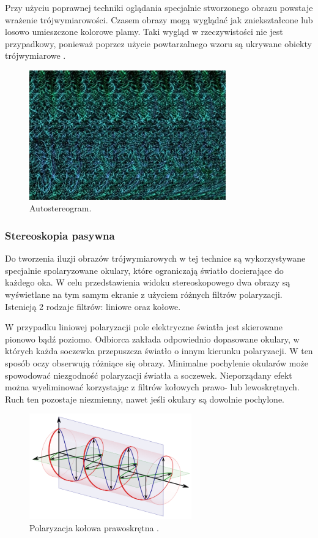 Przy użyciu poprawnej techniki oglądania specjalnie stworzonego obrazu powstaje wrażenie trójwymiarowości. Czasem obrazy mogą wyglądać jak zniekształcone lub losowo umieszczone kolorowe plamy. Taki wygląd w rzeczywistości nie jest przypadkowy, ponieważ poprzez użycie powtarzalnego wzoru są ukrywane obiekty trójwymiarowe \cite{stereoscopythesis}.

\begin{figure}[H]
		\centering
 		\includegraphics[width=8.5cm]{68.jpg}
    	\caption{Autostereogram\cite{autostereogram}.}
 		\label{rys26}
\end{figure}

\subsubsection{Stereoskopia pasywna} 
Do tworzenia iluzji obrazów trójwymiarowych w tej technice są wykorzystywane specjalnie spolaryzowane okulary, które ograniczają światło docierające do każdego oka. W celu przedstawienia widoku stereoskopowego dwa obrazy są wyświetlane na tym samym ekranie z użyciem różnych filtrów polaryzacji. Istenieją 2 rodzaje filtrów: liniowe oraz kołowe.

W przypadku liniowej polaryzacji pole elektryczne światła jest skierowane pionowo bądź poziomo. Odbiorca zakłada odpowiednio dopasowane okulary, w których każda soczewka przepuszcza światło o innym kierunku polaryzacji. W ten sposób oczy obserwują różniące się obrazy. Minimalne pochylenie okularów może spowodować niezgodność polaryzacji światła a soczewek. Nieporządany efekt można wyeliminować korzystając z filtrów kołowych prawo- lub lewoskrętnych. Ruch ten pozostaje niezmienny, nawet jeśli okulary są dowolnie pochylone.

\begin{figure}[H]
		\centering
 		\includegraphics[width=7.0cm]{circular.png}
    	\caption{Polaryzacja kołowa prawoskrętna \cite{polarization}.}
 		\label{rys3}
\end{figure}

